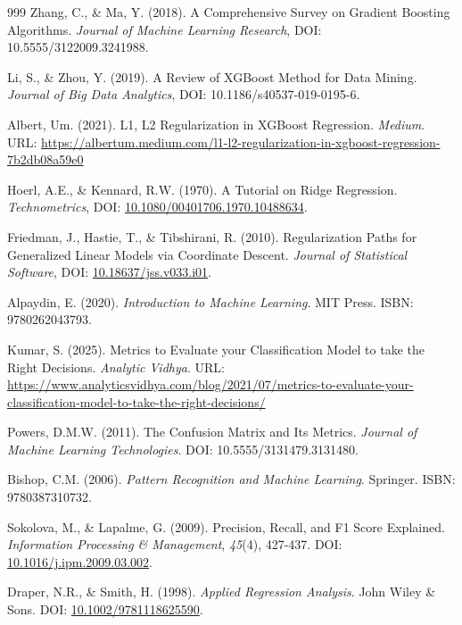 \documentclass[12pt, a4paper,oneside]{book}
\numberwithin{equation}{section}
\begin{document}
\begin{thebibliography}{999}
Zhang, C., \& Ma, Y. (2018). A Comprehensive Survey on Gradient Boosting Algorithms. \textit{Journal of Machine Learning Research}, DOI: 10.5555/3122009.3241988.

Li, S., \& Zhou, Y. (2019). A Review of XGBoost Method for Data Mining. \textit{Journal of Big Data Analytics}, DOI: 10.1186/s40537-019-0195-6.

Albert, Um. (2021). L1, L2 Regularization in XGBoost Regression. \textit{Medium}. URL: \href{https://albertum.medium.com/l1-l2-regularization-in-xgboost-regression-7b2db08a59e0}{https://albertum.medium.com/l1-l2-regularization-in-xgboost-regression-7b2db08a59e0}

Hoerl, A.E., \& Kennard, R.W. (1970). A Tutorial on Ridge Regression. \textit{Technometrics}, DOI: \href{https://doi.org/10.1080/00401706.1970.10488634}{10.1080/00401706.1970.10488634}.

Friedman, J., Hastie, T., \& Tibshirani, R. (2010). Regularization Paths for Generalized Linear Models via Coordinate Descent. \textit{Journal of Statistical Software}, DOI: \href{https://doi.org/10.18637/jss.v033.i01}{10.18637/jss.v033.i01}.

Alpaydin, E. (2020). \textit{Introduction to Machine Learning}. MIT Press. ISBN: 9780262043793.

Kumar, S. (2025). Metrics to Evaluate your Classification Model to take the Right Decisions. \textit{Analytic Vidhya}. URL: \href{https://www.analyticsvidhya.com/blog/2021/07/metrics-to-evaluate-your-classification-model-to-take-the-right-decisions/}{https://www.analyticsvidhya.com/blog/2021/07/metrics-to-evaluate-your-classification-model-to-take-the-right-decisions/}

Powers, D.M.W. (2011). The Confusion Matrix and Its Metrics. \textit{Journal of Machine Learning Technologies}. DOI: 10.5555/3131479.3131480.

Bishop, C.M. (2006). \textit{Pattern Recognition and Machine Learning}. Springer. ISBN: 9780387310732.

Sokolova, M., \& Lapalme, G. (2009). Precision, Recall, and F1 Score Explained. \textit{Information Processing \& Management}, \textit{45}(4), 427-437. DOI: \href{https://doi.org/10.1016/j.ipm.2009.03.002}{10.1016/j.ipm.2009.03.002}.
  
Draper, N.R., \& Smith, H. (1998). \textit{Applied Regression Analysis}. John Wiley \& Sons. DOI: \href{https://doi.org/10.1002/9781118625590}{10.1002/9781118625590}.


\end{thebibliography}
\end{document}
